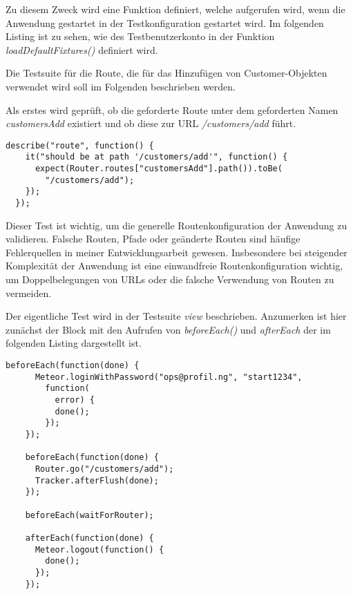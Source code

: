 Zu diesem Zweck wird eine Funktion definiert, welche aufgerufen wird, wenn die
Anwendung gestartet in der Testkonfiguration gestartet wird. Im folgenden
Listing ist zu sehen, wie des Testbenutzerkonto in der Funktion
\textit{loadDefaultFixtures()} definiert wird.



Die Testsuite für die Route, die für das Hinzufügen von Customer-Objekten
verwendet wird soll im Folgenden beschrieben werden.



Als erstes wird geprüft, ob die geforderte Route unter dem geforderten Namen
\textit{customersAdd} existiert und ob diese zur URL \textit{/customers/add}
führt.

\begin{lstlisting}[caption=Test auf Existenz der Route 'customersAdd']
  describe("route", function() {
    it("should be at path '/customers/add'", function() {
      expect(Router.routes["customersAdd"].path()).toBe(
        "/customers/add");
    });
  });
\end{lstlisting}

Dieser Test ist wichtig, um die generelle Routenkonfiguration der Anwendung zu
validieren. Falsche Routen, Pfade oder geänderte Routen sind häufige
Fehlerquellen in meiner Entwicklungsarbeit gewesen. Insbesondere bei steigender
Komplexität der Anwendung ist eine einwandfreie Routenkonfiguration wichtig, um
Doppelbelegungen von URLs oder die falsche Verwendung von Routen zu vermeiden.

Der eigentliche Test wird in der Testsuite \textit{view} beschrieben. Anzumerken ist hier
zunächst der Block mit den Aufrufen von \textit{beforeEach()} und \textit{afterEach} der im
folgenden Listing dargestellt ist.

\begin{lstlisting}[caption=Vor- und Nachtestkonfiguration]
  beforeEach(function(done) {
      Meteor.loginWithPassword("ops@profil.ng", "start1234",
        function(
          error) {
          done();
        });
    });

    beforeEach(function(done) {
      Router.go("/customers/add");
      Tracker.afterFlush(done);
    });

    beforeEach(waitForRouter);

    afterEach(function(done) {
      Meteor.logout(function() {
        done();
      });
    });
\end{lstlisting}

